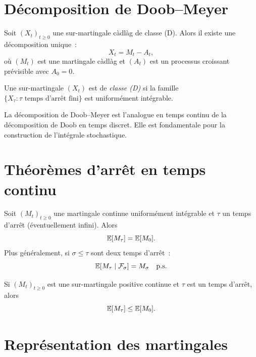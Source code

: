 \section{D\'ecomposition de Doob--Meyer}

\begin{theoreme}
\label{thm:doob_meyer}
Soit $(X_t)_{t \geq 0}$ une sur-martingale c\`adl\`ag de classe (D). Alors il
existe une d\'ecomposition unique~:
\[
  X_t = M_t - A_t,
\]
o\`u $(M_t)$ est une martingale c\`adl\`ag et $(A_t)$ est un processus croissant
pr\'evisible avec $A_0 = 0$.
\end{theoreme}

\begin{definition}[Classe (D)]
Une sur-martingale $(X_t)$ est de \emph{classe (D)} si la famille
$\{X_{\tau} : \tau \text{ temps d'arr\^et fini}\}$ est uniform\'ement int\'egrable.
\end{definition}

\begin{remarque}
La d\'ecomposition de Doob--Meyer est l'analogue en temps continu de la
d\'ecomposition de Doob en temps discret. Elle est fondamentale pour la
construction de l'int\'egrale stochastique.
\end{remarque}

\section{Th\'eor\`emes d'arr\^et en temps continu}

\begin{theoreme}
\label{thm:arret_continu}
Soit $(M_t)_{t \geq 0}$ une martingale continue uniform\'ement int\'egrable et
$\tau$ un temps d'arr\^et (\'eventuellement infini). Alors
\[
  \mathbb{E}[M_{\tau}] = \mathbb{E}[M_0].
\]
Plus g\'en\'eralement, si $\sigma \leq \tau$ sont deux temps d'arr\^et~:
\[
  \mathbb{E}[M_{\tau} \mid \mathcal{F}_{\sigma}] = M_{\sigma} \quad \text{p.s.}
\]
\end{theoreme}

\begin{theoreme}
\label{thm:arret_surmartingale}
Si $(M_t)_{t \geq 0}$ est une sur-martingale positive continue et $\tau$ est
un temps d'arr\^et, alors
\[
  \mathbb{E}[M_{\tau}] \leq \mathbb{E}[M_0].
\]
\end{theoreme}

\section{Repr\'esentation des martingales}

